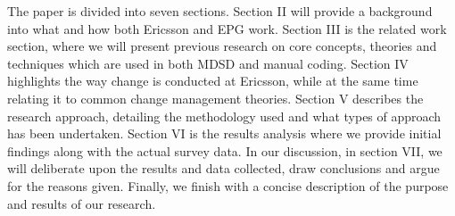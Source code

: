 \documentclass[fina_report_innit.tex]{subfiles}
\begin{document}
The paper is divided into seven sections. Section II will provide a background into what and how both Ericsson and EPG work. Section III is the related work section, where we will present previous research on core concepts, theories and techniques which are used in both MDSD and manual coding. Section IV highlights the way change is conducted at Ericsson, while at the same time relating it to common change management theories. Section V describes the research approach, detailing the methodology used and what types of approach has been undertaken. Section VI is the results analysis where we provide initial findings along with the actual survey data. In our discussion, in section VII, we will deliberate upon the results and data collected, draw conclusions and argue for the reasons given. Finally, we finish with a concise description of the purpose and results of our research.
\end{document}
